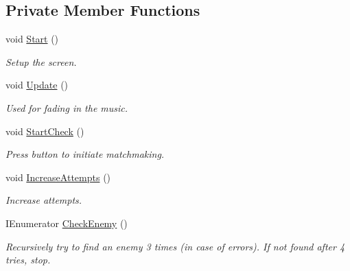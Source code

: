 \subsection*{Private Member Functions}
\begin{DoxyCompactItemize}
\item 
\mbox{\label{class_unranked_match_a7361150ca22d5a53cdbfe4d34a6c94ea}} 
void \mbox{\hyperlink{class_unranked_match_a7361150ca22d5a53cdbfe4d34a6c94ea}{Start}} ()
\begin{DoxyCompactList}\small\item\em Setup the screen. \end{DoxyCompactList}\item 
\mbox{\label{class_unranked_match_a11b0733dd14df9f9abcf75dfd7047172}} 
void \mbox{\hyperlink{class_unranked_match_a11b0733dd14df9f9abcf75dfd7047172}{Update}} ()
\begin{DoxyCompactList}\small\item\em Used for fading in the music. \end{DoxyCompactList}\item 
\mbox{\label{class_unranked_match_a39c95f995b2fbaecfc07f24e9ec847a9}} 
void \mbox{\hyperlink{class_unranked_match_a39c95f995b2fbaecfc07f24e9ec847a9}{Start\+Check}} ()
\begin{DoxyCompactList}\small\item\em Press button to initiate matchmaking. \end{DoxyCompactList}\item 
\mbox{\label{class_unranked_match_a155dc55d0125b9fa9fe2625d976e6278}} 
void \mbox{\hyperlink{class_unranked_match_a155dc55d0125b9fa9fe2625d976e6278}{Increase\+Attempts}} ()
\begin{DoxyCompactList}\small\item\em Increase attempts. \end{DoxyCompactList}\item 
\mbox{\label{class_unranked_match_ae723d97807f1686b46648b2bbee881ee}} 
I\+Enumerator \mbox{\hyperlink{class_unranked_match_ae723d97807f1686b46648b2bbee881ee}{Check\+Enemy}} ()
\begin{DoxyCompactList}\small\item\em Recursively try to find an enemy 3 times (in case of errors). If not found after 4 tries, stop. \end{DoxyCompactList}\end{DoxyCompactItemize}
